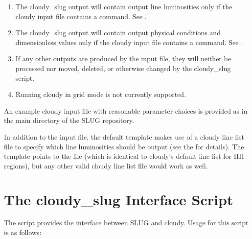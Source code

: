 \documentclass[letterpaper,10pt,english]{sphinxmanual}
\begin{document}
\begin{enumerate}
\item {} 
The cloudy\_slug output will contain output line luminosities only
if the cloudy input file contains a  command. See {\hyperref[\detokenize{cloudy:ssec-cloudy-output}]{}}.

\item {} 
The cloudy\_slug output will contain output physical conditions and
dimensionless values only if the cloudy input file contains a
 command. See
{\hyperref[\detokenize{cloudy:ssec-cloudy-output}]{}}.

\item {} 
If any other outputs are produced by the input file, they will
neither be processed nor moved, deleted, or otherwise changed by
the cloudy\_slug script.

\item {} 
Running cloudy in grid mode is not currently supported.

\end{enumerate}

An example cloudy input file with reasonable parameter choices is
provided as  in the main directory
of the SLUG repository.

In addition to the input file, the default template makes use of a
cloudy line list file to specify which line luminosities should be
output (see the  for
details). The template points to the file
 (which is identical to cloudy’s
default line list for HII regions), but any other valid cloudy line
list file would work as well.


\section{The cloudy\_slug Interface Script}
\label{\detokenize{cloudy:the-cloudy-slug-interface-script}}\label{\detokenize{cloudy:ssec-cloudy-slug-options}}
The  script provides the interface between SLUG and
cloudy. Usage for this script is as follows:
\end{document}
